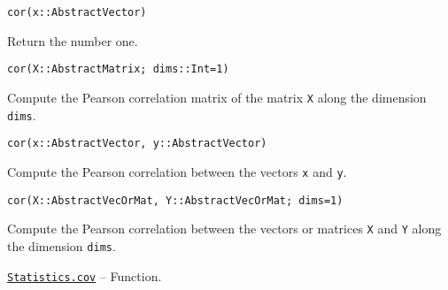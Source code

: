 \begin{adjustwidth}{2em}{0pt}


\begin{verbatim}
cor(x::AbstractVector)
\end{verbatim}

Return the number one.




\begin{lstlisting}
cor(X::AbstractMatrix; dims::Int=1)
\end{lstlisting}

Compute the Pearson correlation matrix of the matrix \texttt{X} along the dimension \texttt{dims}.




\begin{lstlisting}
cor(x::AbstractVector, y::AbstractVector)
\end{lstlisting}

Compute the Pearson correlation between the vectors \texttt{x} and \texttt{y}.




\begin{lstlisting}
cor(X::AbstractVecOrMat, Y::AbstractVecOrMat; dims=1)
\end{lstlisting}

Compute the Pearson correlation between the vectors or matrices \texttt{X} and \texttt{Y} along the dimension \texttt{dims}.



\end{adjustwidth}
\hypertarget{7202855476046698513}{} 
\hyperlink{7202855476046698513}{\texttt{Statistics.cov}}  -- {Function.}

